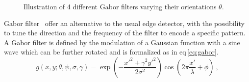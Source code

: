 \begin{figure}
	\hspace*{\fill}
		 \hfill
		 \hfill
		 \hfill
	\hspace*{\fill}
	\caption[Illustration of 4 different Gabor filters.]{Illustration of 4 different Gabor filters varying their orientations $\theta$.}
	\label{fig:gabor}
\end{figure}

Gabor filter~\cite{Gabor1946,Daugman1985} offer an alternative to the usual edge detector, with the possibility to tune the direction and the frequency of the filter to encode a specific pattern. 
A Gabor filter is defined by the modulation of a Gaussian function with a sine wave which can be further rotated and is formalized as in \acs{eq}\,\ref{eq:gabor}.
\begin{equation}
	g(x,y;\theta,\psi,\sigma,\gamma) = \exp \left( - \frac{x'^{2}+ \gamma^{2}y'^{2}}{2 \sigma^{2}} \right) \cos \left( 2 \pi \frac{x'}{\lambda} + \phi \right) \ ,
        \label{eq:gabor}
\end{equation}

